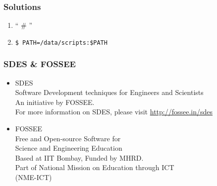 \documentclass[17pt,compress]{beamer}
\begin{document}

\begin{frame}
\frametitle{Solutions}
\label{sec-10}


\begin{enumerate}
\item `` \# ''
\vspace{15pt}
\item \texttt{\$ PATH=/data/scripts:\$PATH}
\end{enumerate}
\end{frame}

\begin{frame}
\frametitle{SDES \& FOSSEE}
\begin{center}
\begin{itemize}
\item \small{SDES}\\
\small{\color{LimeGreen}Software Development techniques for Engineers and Scientists} \\
\scriptsize An initiative by FOSSEE. \\
\vspace{3pt}
\scriptsize For more information on SDES, please visit {\color{blue}\url{http://fossee.in/sdes}}\\
\vspace{10pt}
\item \small{FOSSEE}\\
\small {\color{LimeGreen}Free and Open-source Software for \\Science and Engineering Education} \\
\scriptsize Based at IIT Bombay, Funded by MHRD.\\
\vspace{3pt}
\scriptsize Part of National Mission on Education through ICT \\(NME-ICT) \\
\end{itemize}
\end{center}
\end{frame}
\end{document}

